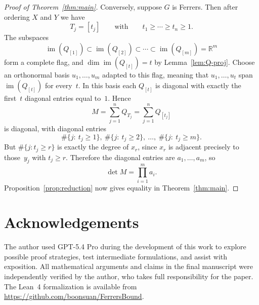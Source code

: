 \documentclass[twoside, reqno]{amsart}
\theoremstyle{definition}
\theoremstyle{remark}
\newcommand{\RR}{\mathbb R}
\begin{document}
\begin{proof}[Proof of Theorem~\ref{thm:main}]
Conversely, suppose $G$ is Ferrers. Then after ordering $X$ and $Y$ we have
\[
T_j=[t_j]\qquad\text{with}\qquad t_1\ge\cdots\ge t_n\ge 1.
\]
The subspaces
\[
\operatorname{im}(Q_{[1]})\subset \operatorname{im}(Q_{[2]})
\subset \cdots \subset \operatorname{im}(Q_{[m]})=\RR^m
\]
form a complete flag, and $\dim \operatorname{im}(Q_{[t]})=t$ by 
Lemma~\ref{lem:Q-proj}. Choose an orthonormal basis $u_1,\dots,u_m$ adapted 
to this flag, meaning that $u_1,\dots,u_t$ span $\operatorname{im}(Q_{[t]})$ 
for every~$t$. In this basis each $Q_{[t]}$ is diagonal with exactly the 
first~$t$ diagonal entries equal to~$1$. Hence
\[
M=\sum_{j=1}^n Q_{T_j}=\sum_{j=1}^n Q_{[t_j]}
\]
is diagonal, with diagonal entries
\[
\#\{j:\ t_j\ge 1\},\ \#\{j:\ t_j\ge 2\},\ \dots,\ \#\{j:\ t_j\ge m\}.
\]
But $\#\{j: t_j\ge r\}$ is exactly the degree of $x_r$, since $x_r$ is 
adjacent precisely to those~$y_j$ with $t_j\ge r$. Therefore the diagonal 
entries are $a_1,\dots,a_m$, so
\[
\det M=\prod_{i=1}^m a_i.
\]
Proposition~\ref{prop:reduction} now gives equality in Theorem~\ref{thm:main}.
\end{proof}

\section*{Acknowledgements}
The author used GPT-5.4 Pro during the development of this work to 
explore possible proof strategies, test intermediate formulations, 
and assist with exposition. All mathematical arguments and claims in 
the final manuscript were independently verified by the author, who 
takes full responsibility for the paper. 
The Lean~4 formalization is available from
\url{https://github.com/boonsuan/FerrersBound}.
\end{document}
